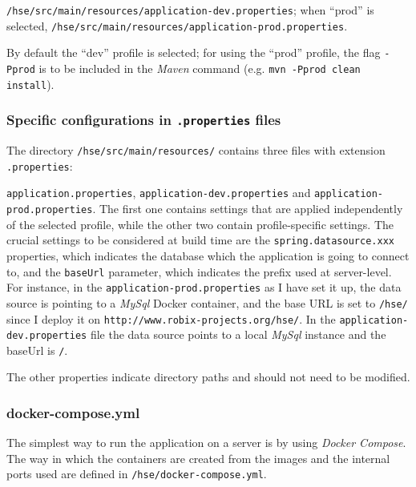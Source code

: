 \documentclass[a4paper]{usiinfbachelorproject}
\begin{document}
\begin{appendices}
\texttt{/hse/src/main/resources/application-dev.properties};
        when ``prod'' is selected, \texttt{/hse/src/main/resources/application-prod.properties}. 

        By default the ``dev'' profile is selected;
        for using the ``prod'' profile, the flag \texttt{-Pprod} is to be included in the \emph{Maven} command 
        (e.g. \texttt{mvn -Pprod clean install}).

        \subsubsection{Specific configurations in \texttt{.properties} files}

        The directory \texttt{/hse/src/main/resources/} contains three files with extension \texttt{.properties}:

        \texttt{application.properties}, \texttt{application-dev.properties} and \texttt{application-prod.properties}.
        The first one contains settings that are applied independently of the selected profile, while the other
        two contain profile-specific settings. The crucial settings to be considered at build time are the 
        \texttt{spring.datasource.xxx} properties, which indicates the database which the application is going to connect to, and 
        the \texttt{baseUrl} parameter, which indicates the prefix used at server-level.
        For instance, in the \texttt{application-prod.properties} as I have set it up, the data source is pointing to a \emph{MySql} Docker container,
        and the base URL is set to \texttt{/hse/} since I deploy it on \texttt{http://www.robix-projects.org/hse/}. 
        In the \texttt{application-dev.properties} file the data source points to a local \emph{MySql} instance and the baseUrl is \texttt{/}.

        The other properties indicate directory paths and should not need to be modified.

        \subsubsection{docker-compose.yml}

        The simplest way to run the application on a server is by using \emph{Docker Compose}. The way in which the containers are created from the images
        and the internal ports used are defined in 
        \texttt{/hse/docker-compose.yml}.


\end{appendices}
\end{document}
